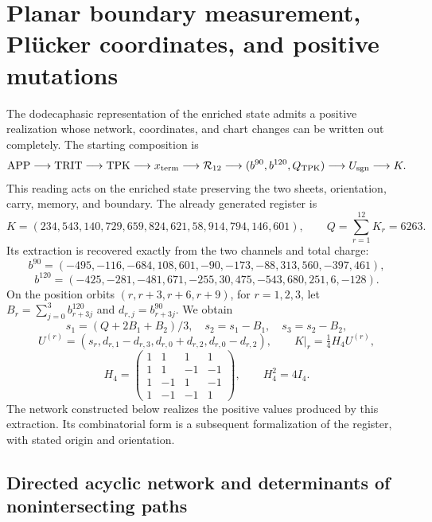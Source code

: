 \section{Planar boundary measurement, Plücker coordinates, and positive mutations}
\label{app:network-cluster}

The dodecaphasic representation of the enriched state admits a positive
realization whose network, coordinates, and chart changes can be written
out completely. The starting composition is
\[
 \mathrm{APP}\longrightarrow\mathrm{TRIT}\longrightarrow\mathrm{TPK}
 \longrightarrow x_{\rm term}\longrightarrow\mathcal R_{12}
 \longrightarrow(b^{90},b^{120},Q_{\rm TPK})
 \longrightarrow U_{\rm sgn}\longrightarrow K.
\]
This reading acts on the enriched state preserving the two sheets,
orientation, carry, memory, and boundary. The already generated register is
\[
 K=(234,543,140,729,659,824,621,58,914,794,146,601),
 \qquad Q=\sum_{r=1}^{12}K_r=6263.
\]
Its extraction is recovered exactly from the two channels and total charge:
\[
 b^{90}=(-495,-116,-684,108,601,-90,-173,-88,313,560,-397,461),
\]
\[
 b^{120}=(-425,-281,-481,671,-255,30,475,-543,680,251,6,-128).
\]
On the position orbits \((r,r+3,r+6,r+9)\), for \(r=1,2,3\),
let \(B_r=\sum_{j=0}^3b^{120}_{r+3j}\) and
\(d_{r,j}=b^{90}_{r+3j}\). We obtain
\[
 s_1=(Q+2B_1+B_2)/3,\quad s_2=s_1-B_1,\quad s_3=s_2-B_2,
\]
\[
 U^{(r)}=(s_r,d_{r,1}-d_{r,3},d_{r,0}+d_{r,2},d_{r,0}-d_{r,2}),
 \qquad K|_r=\tfrac14H_4U^{(r)},
\]
\[
 H_4=\begin{pmatrix}1&1&1&1\\1&1&-1&-1\\1&-1&1&-1\\1&-1&-1&1\end{pmatrix},
 \qquad H_4^2=4I_4.
\]
The network constructed below realizes the positive values produced by
this extraction. Its combinatorial form is a subsequent formalization
of the register, with stated origin and orientation.

\subsection{Directed acyclic network and determinants of nonintersecting paths}

